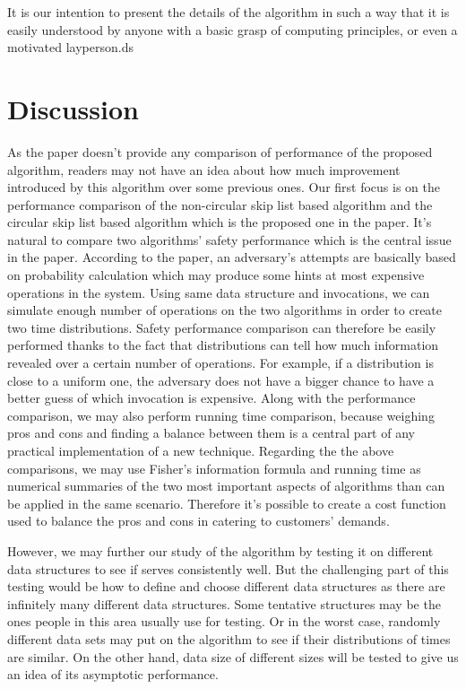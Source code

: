 \documentclass[11pt,twocolumn]{article}
\begin{document}
It is our intention to present the details of the algorithm in such a way that
it is easily understood by anyone with a basic grasp of computing principles,
or even a motivated layperson.ds


\section{Discussion}

As the paper doesn't provide any comparison of performance of the proposed algorithm, readers may not have an idea about how much improvement introduced by this algorithm over some previous ones. Our first focus is on the performance comparison of the non-circular skip list based algorithm and the circular skip list based algorithm which is the proposed one in the paper. It's natural to compare two algorithms' safety performance which is the central issue in the paper. According to the paper, an adversary's attempts are basically based on probability calculation which may produce some hints at most expensive operations in the system. Using same data structure and invocations, we can simulate enough number of operations on the two algorithms in order to create two time distributions. Safety performance comparison can therefore be easily performed thanks to the fact that distributions can tell how much information revealed over a certain number of operations. For example, if a distribution is close to a uniform one, the adversary does not have a bigger chance to have a  better guess of which invocation is expensive. Along with the performance comparison, we may also perform running time comparison, because weighing pros and cons and finding a balance between them is a central part of any practical implementation of a new technique. Regarding the the above comparisons, we may use Fisher's information formula and running time as numerical summaries of the two most important aspects of algorithms than can be applied in the same scenario. Therefore it's possible to create  a cost function used to balance the pros and cons in catering to customers' demands. 

However, we may further our study of the algorithm by testing it on different data structures to see if serves  consistently well. But the challenging part of this testing would be how to define and choose different data structures as there are infinitely many different data structures. Some tentative structures may be the ones people in this area usually use for testing. Or in the worst case, randomly different data sets  may put on the algorithm to see if their distributions of times are similar. On the other hand, data size of different sizes will be tested to give us an idea of its asymptotic performance. 
\end{document}
